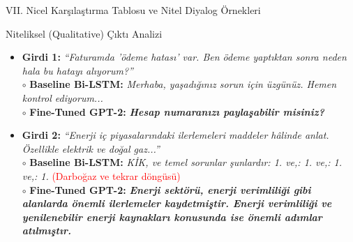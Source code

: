 \documentclass[aspectratio=169,10pt]{beamer}
\begin{document}
\begin{frame}{VII. Nicel Karşılaştırma Tablosu ve Nitel Diyalog Örnekleri}
    \begin{table}
        \centering
    \end{table}
    \vspace{-4pt}
    \begin{block}{Niteliksel (Qualitative) Çıktı Analizi}
        \begin{itemize}
            \item \textbf{Girdi 1:} \textit{``Faturamda 'ödeme hatası' var. Ben ödeme yaptıktan sonra neden hala bu hatayı alıyorum?''}\\
            $\circ$ \textbf{Baseline Bi-LSTM:} \textit{Merhaba, yaşadığınız sorun için üzgünüz. Hemen kontrol ediyorum...}\\
            $\circ$ \textbf{Fine-Tuned GPT-2:} \textbf{\textit{Hesap numaranızı paylaşabilir misiniz?}}
            \item \textbf{Girdi 2:} \textit{``Enerji iç piyasalarındaki ilerlemeleri maddeler hâlinde anlat. Özellikle elektrik ve doğal gaz...''}\\
            $\circ$ \textbf{Baseline Bi-LSTM:} \textit{KİK, ve temel sorunlar şunlardır: 1. ve,: 1. ve,: 1. ve,: 1.} \textcolor{red}{(Darboğaz ve tekrar döngüsü)}\\
            $\circ$ \textbf{Fine-Tuned GPT-2:} \textbf{\textit{Enerji sektörü, enerji verimliliği gibi alanlarda önemli ilerlemeler kaydetmiştir. Enerji verimliliği ve yenilenebilir enerji kaynakları konusunda ise önemli adımlar atılmıştır.}}
        \end{itemize}
    \end{block}
\end{frame}
\end{document}
